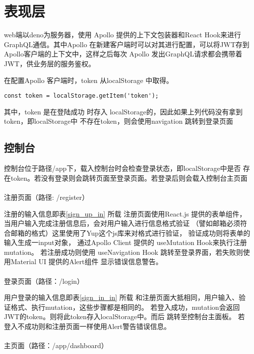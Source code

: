 \section{表现层}
web端以deno为服务器，使用 Apollo 提供的上下文包装器和React Hook来进行
GraphQL通信。其中Apollo 在新建客户端时可以对其进行配置，可以将JWT存到
Apollo客户端的上下文中，这样之后每次 Apollo 发出GraphQL请求都会携带着
JWT，供业务层的服务鉴权。

在配置Apollo 客户端时，token 从localStorage 中取得。
\begin{lstlisting}
const token = localStorage.getItem('token');
\end{lstlisting}

其中，token 是在登陆成功
时存入 localStorage的，因此如果上列代码没有拿到token，即localStorage中
不存在token，则会使用navigation 跳转到登录页面

\subsection{控制台}
控制台位于路径/app下，载入控制台时会检查登录状态，即localStorage中是否
存在token。若没有登录则会跳转页面至登录页面。若登录后则会载入控制台主页面

\paragraph{} 注册页面（路径: /register）

注册的输入信息即表\ref{sign_up_in} 所载
注册页面使用React.js 提供的表单组件，当用户输入完成注册信息后，会对用户输入进行信息格式验证
（譬如邮箱必须符合邮箱的格式）这里使用了Yup这个js库来对格式进行验证，
验证成功则将表单的输入生成一input对象，
通过Apollo Client 提供的 useMutation Hook来执行注册mutation。
若注册成功则使用 useNavigation Hook 跳转至登录界面，若失败则使用Material UI 提供的Alert组件
显示错误信息警告。

\paragraph{} 登录页面（路径：/login）


用户登录的输入信息即表\ref{sign_in_in} 所载
和注册页面大抵相同，用户输入、验证格式、执行mutation，这些步骤都是相同的。
若登入成功，mutation会返回JWT的token。则将此token存入localStorage中。而后
跳转至控制台主面板。
若登入不成功则和注册页面一样使用Alert警告错误信息。

\paragraph{} 主页面（路径：/app/dashboard）

